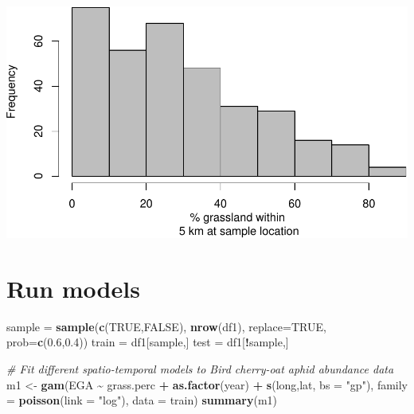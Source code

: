 \documentclass[
]{book}
\newenvironment{Shaded}{\begin{snugshade}}{\end{snugshade}}
\newcommand{\AttributeTok}[1]{\textcolor[rgb]{0.13,0.29,0.53}{#1}}
\newcommand{\CommentTok}[1]{\textcolor[rgb]{0.56,0.35,0.01}{\textit{#1}}}
\newcommand{\ConstantTok}[1]{\textcolor[rgb]{0.56,0.35,0.01}{#1}}
\newcommand{\FloatTok}[1]{\textcolor[rgb]{0.00,0.00,0.81}{#1}}
\newcommand{\FunctionTok}[1]{\textcolor[rgb]{0.13,0.29,0.53}{\textbf{#1}}}
\newcommand{\NormalTok}[1]{#1}
\newcommand{\OtherTok}[1]{\textcolor[rgb]{0.56,0.35,0.01}{#1}}
\newcommand{\SpecialCharTok}[1]{\textcolor[rgb]{0.81,0.36,0.00}{\textbf{#1}}}
\newcommand{\StringTok}[1]{\textcolor[rgb]{0.31,0.60,0.02}{#1}}
\begin{document}
\includegraphics{_main_files/figure-latex/unnamed-chunk-30-1.pdf}

\hypertarget{run-models}{%
\chapter{Run models}\label{run-models}}

\begin{Shaded}
\begin{Highlighting}[]
\NormalTok{sample }\OtherTok{=} \FunctionTok{sample}\NormalTok{(}\FunctionTok{c}\NormalTok{(}\ConstantTok{TRUE}\NormalTok{,}\ConstantTok{FALSE}\NormalTok{), }\FunctionTok{nrow}\NormalTok{(df1), }\AttributeTok{replace=}\ConstantTok{TRUE}\NormalTok{, }\AttributeTok{prob=}\FunctionTok{c}\NormalTok{(}\FloatTok{0.6}\NormalTok{,}\FloatTok{0.4}\NormalTok{)) }
\NormalTok{train }\OtherTok{=}\NormalTok{ df1[sample,]}
\NormalTok{test }\OtherTok{=}\NormalTok{ df1[}\SpecialCharTok{!}\NormalTok{sample,]}

\CommentTok{\# Fit different spatio{-}temporal models to Bird cherry{-}oat aphid abundance data }
\NormalTok{m1 }\OtherTok{\textless{}{-}} \FunctionTok{gam}\NormalTok{(EGA }\SpecialCharTok{\textasciitilde{}}\NormalTok{ grass.perc }\SpecialCharTok{+} \FunctionTok{as.factor}\NormalTok{(year) }\SpecialCharTok{+} \FunctionTok{s}\NormalTok{(long,lat, }\AttributeTok{bs =} \StringTok{"gp"}\NormalTok{), }
          \AttributeTok{family =} \FunctionTok{poisson}\NormalTok{(}\AttributeTok{link =} \StringTok{"log"}\NormalTok{), }\AttributeTok{data =}\NormalTok{ train)}
\FunctionTok{summary}\NormalTok{(m1)}
\end{Highlighting}
\end{Shaded}
\end{document}
